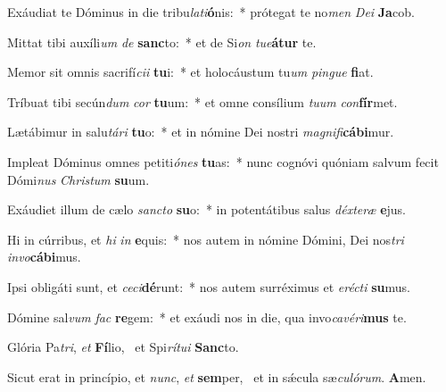 \item Exáudiat te Dóminus in die tribu\textit{la}\textit{ti}\textbf{ó}nis:~* prótegat te no\textit{men} \textit{De}\textit{i} \textbf{Ja}cob.
\item Mittat tibi auxíli\textit{um} \textit{de} \textbf{sanc}to:~* et de Si\textit{on} \textit{tu}\textit{e}\textbf{á}\textbf{tur} te.
\item Memor sit omnis sacrifí\textit{ci}\textit{i} \textbf{tu}i:~* et holocáustum tu\textit{um} \textit{pin}\textit{gue} \textbf{fi}at.
\item Tríbuat tibi secún\textit{dum} \textit{cor} \textbf{tu}um:~* et omne consílium \textit{tu}\textit{um} \textit{con}\textbf{fír}met.
\item Lætábimur in salu\textit{tá}\textit{ri} \textbf{tu}o:~* et in nómine Dei nostri \textit{ma}\textit{gni}\textit{fi}\textbf{cá}\textbf{bi}mur.
\item Impleat Dóminus omnes petiti\textit{ó}\textit{nes} \textbf{tu}as:~* nunc cognóvi quóniam salvum fecit Dómi\textit{nus} \textit{Chris}\textit{tum} \textbf{su}um.
\item Exáudiet illum de cælo \textit{sanc}\textit{to} \textbf{su}o:~* in potentátibus salus \textit{déx}\textit{te}\textit{ræ} \textbf{e}jus.
\item Hi in cúrribus, et \textit{hi} \textit{in} \textbf{e}quis:~* nos autem in nómine Dómini, Dei nos\textit{tri} \textit{in}\textit{vo}\textbf{cá}\textbf{bi}mus.
\item Ipsi obligáti sunt, et \textit{ce}\textit{ci}\textbf{dé}runt:~* nos autem surréximus et \textit{e}\textit{réc}\textit{ti} \textbf{su}mus.
\item Dómine sal\textit{vum} \textit{fac} \textbf{re}gem:~* et exáudi nos in die, qua invo\textit{ca}\textit{vé}\textit{ri}\textbf{mus} te.
\item Glória Pa\textit{tri}, \textit{et} \textbf{Fí}lio,~\psstar{} et Spi\textit{rí}\textit{tu}\textit{i} \textbf{Sanc}to.
\item Sicut erat in princípio, et \textit{nunc}, \textit{et} \textbf{sem}per,~\psstar{} et in sǽcula sæ\textit{cu}\textit{ló}\textit{rum}. \textbf{A}men.
